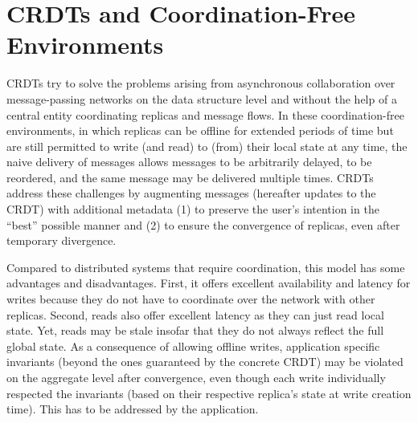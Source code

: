

\section{\acsp{CRDT} and Coordination-Free Environments}\label{sec:crdt-coordination-free}

\acfp{CRDT}\footnotemark{} try to solve the problems arising from asynchronous
collaboration over message-passing networks on the data structure level and
without the help of a central entity coordinating replicas and message flows.
In these coordination-free environments, in which replicas can be offline
for extended periods of time but are still permitted to write (and read)
to (from) their local state at any time,
the naive delivery of messages allows messages to be arbitrarily delayed,
to be reordered, and the same message may be delivered multiple times.
\acp{CRDT} address these challenges by augmenting messages (hereafter updates
to the \ac{CRDT}) with additional metadata (1) to preserve the user's intention
in the ``best'' possible manner and (2) to ensure the convergence of replicas,
even after temporary divergence.


Compared to distributed systems that require coordination,
this model has some advantages and disadvantages.
First, it offers excellent availability and latency for writes because
they do not have to coordinate over the network with other replicas.
Second, reads also offer excellent latency as they can just read local state.
Yet, reads may be stale insofar that they do not always reflect the full global state.
As a consequence of allowing offline writes,
application specific invariants (beyond the ones guaranteed by the concrete \ac{CRDT})
may be violated on the aggregate level after convergence,
even though each write individually respected the invariants (based on their
respective replica's state at write creation time).
This has to be addressed by the application.

